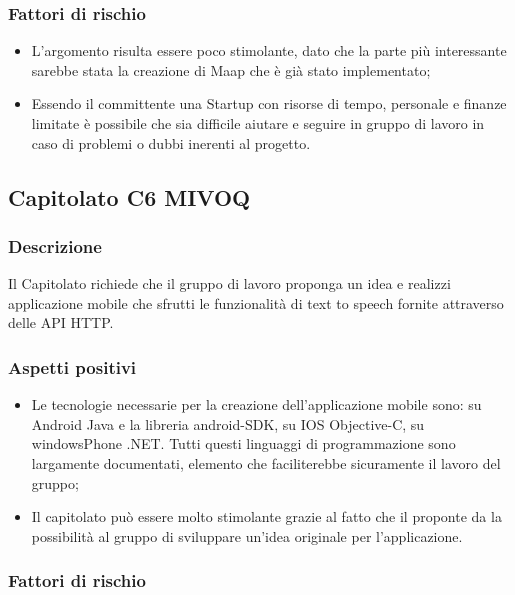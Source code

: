 \documentclass[12pt,a4paper]{article}
\begin{document}
\subsubsection{Fattori di rischio}
\begin{itemize}
\item	L'argomento risulta essere poco stimolante, dato che la parte più interessante sarebbe stata la creazione di Maap che è già stato implementato;

\item	Essendo il committente una Startup con risorse di tempo, personale e	finanze limitate è possibile che sia difficile aiutare e seguire in	gruppo di lavoro in caso di problemi o dubbi inerenti al progetto.
\end{itemize}


\newpage
\subsection{Capitolato C6 MIVOQ}
\subsubsection{Descrizione}

Il Capitolato richiede che il gruppo di lavoro proponga un idea e realizzi applicazione mobile che sfrutti le funzionalità di text to speech fornite attraverso delle API HTTP.

\subsubsection{Aspetti positivi}
\begin{itemize}
	\item Le tecnologie necessarie per la creazione dell'applicazione mobile sono: su Android Java e la libreria android-SDK, su IOS Objective-C, su windowsPhone .NET. Tutti questi linguaggi di programmazione sono largamente documentati, elemento che faciliterebbe sicuramente il lavoro del gruppo;
	\item Il capitolato può essere molto stimolante grazie al fatto che il proponte da la possibilità al gruppo di sviluppare un'idea originale per l'applicazione. 
\end{itemize}
\subsubsection{Fattori di rischio}
\end{document}
